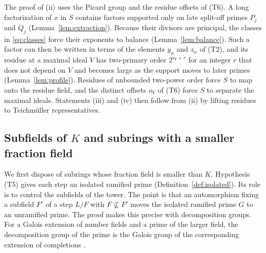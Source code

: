 \documentclass[11pt]{article}
\theoremstyle{plain}
\theoremstyle{definition}
\theoremstyle{remark}
\begin{document}
The proof of (ii) uses the Picard group and the residue offsets of (T6).
A long factorization of $x$ in $S$ contains factors supported only on late
split-off primes $P_j$ and $Q_j$ (Lemma~\ref{lem:extraction}).  Because
their divisors are principal, the classes in
\eqref{eq:classes} force their exponents to balance
(Lemma~\ref{lem:balance}).  Such a factor can then be written in terms of
the elements $y_n$ and $z_n$ of (T2), and its residue at a maximal ideal
$V$ has two-primary order $2^{o_V+r}$ for an integer $r$ that does not
depend on $V$ and becomes large as the support moves to later primes
(Lemma~\ref{lem:profile}).  Residues of unbounded two-power order force
$S$ to map onto the residue field, and the distinct offsets $o_V$ of (T6)
force $S$ to separate the maximal ideals.  Statements (iii) and (iv) then
follow from (ii) by lifting residues to Teichm\"uller representatives.

\subsection{Subfields of \texorpdfstring{$K$}{K} and subrings with a smaller fraction field}
\label{sec:orders-subfields}

We first dispose of subrings whose fraction field is smaller than $K$.
Hypothesis (T5) gives each step an isolated ramified prime
(Definition~\ref{def:isolated}).  Its role is to control the subfields of
the tower.  The point is that an automorphism fixing a subfield $F'$ of
a step $L/F$ with $F\nsubseteq F'$ moves the isolated ramified prime $G$
to an unramified prime.  The proof
makes this precise with decomposition groups.  For
a Galois extension of number fields and a prime of the larger field, the
decomposition group of the prime is the Galois group of the corresponding
extension of completions \cite[Propositions~8.10 and~8.13(a)]{MilneANT}.
\end{document}
